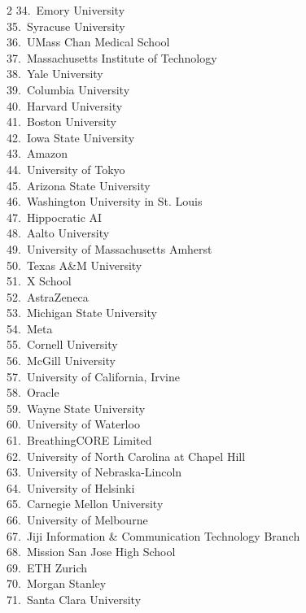 \documentclass{llmxive}
\begin{document}
{\begin{multicols}{2}
34.~Emory University \\
35.~Syracuse University \\
36.~UMass Chan Medical School \\
37.~Massachusetts Institute of Technology \\
38.~Yale University \\
39.~Columbia University \\
40.~Harvard University \\
41.~Boston University \\
42.~Iowa State University \\
43.~Amazon \\
44.~University of Tokyo \\
45.~Arizona State University \\
46.~Washington University in St. Louis \\
47.~Hippocratic AI \\
48.~Aalto University \\
49.~University of Massachusetts Amherst \\
50.~Texas A\&M University \\
51.~X School \\
52.~AstraZeneca \\
53.~Michigan State University \\
54.~Meta \\
55.~Cornell University \\
56.~McGill University \\
57.~University of California, Irvine \\
58.~Oracle \\
59.~Wayne State University \\
60.~University of Waterloo \\
61.~BreathingCORE Limited \\
62.~University of North Carolina at Chapel Hill \\
63.~University of Nebraska-Lincoln \\
64.~University of Helsinki \\
65.~Carnegie Mellon University \\
66.~University of Melbourne \\
67.~Jiji Information \& Communication Technology Branch \\
68.~Mission San Jose High School \\
69.~ETH Zurich \\
70.~Morgan Stanley \\
71.~Santa Clara University \\

\end{multicols}}
\end{document}
